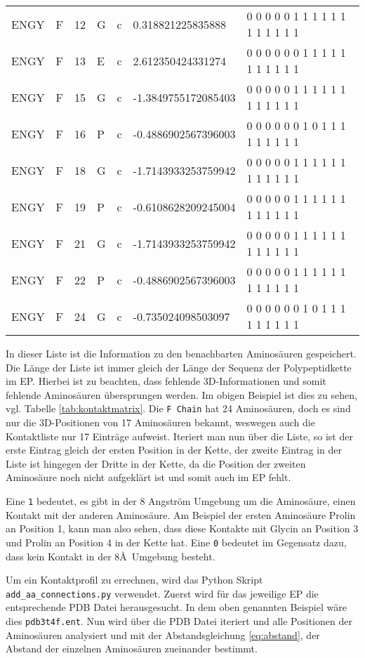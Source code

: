 \begin{table}[H]
{\begin{tabular}{lllllll}
    ENGY & F & 12 & G & c & 0.318821225835888 & 0 0 0 0 0 1 1 1 1 1 1 1 1 1 1 1 1 \\
    ENGY & F & 13 & E & c & 2.612350424331274 & 0 0 0 0 0 0 1 1 1 1 1 1 1 1 1 1 1 \\
    ENGY & F & 15 & G & c & -1.3849755172085403 & 0 0 0 0 0 1 1 1 1 1 1 1 1 1 1 1 1 \\
    ENGY & F & 16 & P & c & -0.4886902567396003 & 0 0 0 0 0 0 1 0 1 1 1 1 1 1 1 1 1 \\
    ENGY & F & 18 & G & c & -1.7143933253759942 & 0 0 0 0 0 1 1 1 1 1 1 1 1 1 1 1 1 \\
    ENGY & F & 19 & P & c & -0.6108628209245004 & 0 0 0 0 0 1 1 1 1 1 1 1 1 1 1 1 1 \\
    ENGY & F & 21 & G & c & -1.7143933253759942 & 0 0 0 0 0 1 1 1 1 1 1 1 1 1 1 1 1 \\
    ENGY & F & 22 & P & c & -0.4886902567396003 & 0 0 0 0 0 1 1 1 1 1 1 1 1 1 1 1 1 \\
    ENGY & F & 24 & G & c & -0.735024098503097 & 0 0 0 0 0 0 1 0 1 1 1 1 1 1 1 1 1
    \end{tabular}}
\end{table}

In dieser Liste ist die Information zu den benachbarten Aminosäuren gespeichert. Die Länge der Liste ist immer gleich der Länge der Sequenz der Polypeptidkette im EP. Hierbei ist zu beachten, dass fehlende 3D-Informationen und somit fehlende Aminosäuren übersprungen werden. Im obigen Beispiel ist dies zu sehen, vgl. Tabelle \ref{tab:kontaktmatrix}. Die \texttt{F Chain} hat 24 Aminosäuren, doch es sind nur die 3D-Positionen von 17 Aminosäuren bekannt, weswegen auch die Kontaktliste nur 17 Einträge aufweist. Iteriert man nun über die Liste, so ist der erste Eintrag gleich der ersten Position in der Kette, der zweite Eintrag in der Liste ist hingegen der Dritte in der Kette, da die Position der zweiten Aminosäure noch nicht aufgeklärt ist und somit auch im \ac{EP} fehlt.

Eine \texttt{1} bedeutet, es gibt in der 8 Angström Umgebung um die Aminosäure, einen Kontakt mit der anderen Aminosäure. Am Beispiel der ersten Aminosäure Prolin an Position 1, kann man also sehen, dass diese Kontakte mit Glycin an Position 3 und Prolin an Position 4 in der Kette hat. Eine \texttt{0} bedeutet im Gegensatz dazu, dass kein Kontakt in der 8\AA\ Umgebung besteht.

Um ein Kontaktprofil zu errechnen, wird das Python Skript \texttt{add\-\_aa\-\_connections.py} verwendet. Zuerst wird für das jeweilige \ac{EP} die entsprechende \ac{PDB} Datei herausgesucht. In dem oben genannten Beispiel wäre dies \texttt{pdb3t4f.ent}. Nun wird über die \ac{PDB} Datei iteriert und alle Positionen der Aminosäuren analysiert und mit der Abstandsgleichung \ref{eq:abstand}, der Abstand der einzelnen Aminosäuren zueinander bestimmt.

